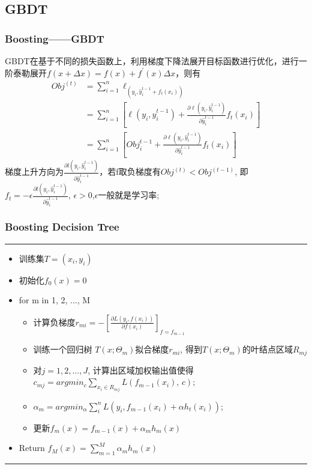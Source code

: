 \documentclass[usenames,dvipsnames]{beamer}
\begin{document}
\subsection{GBDT}
\begin{frame}
\frametitle{Boosting——GBDT}
GBDT在基于不同的损失函数上，利用梯度下降法展开目标函数进行优化，进行一阶泰勒展开$f(x+\Delta x) = f(x) + f^{'}(x)\Delta x$，则有
\begin{align*}
  Obj^{(t)} & = \sum_{i=1}^{n}\ell_(y_i, \hat{y}_{i}^{t-1}+f_t(x_i)) \\
        & = \sum_{i=1}^{n}[\ell(y_i, \hat{y}_{i}^{t-1})+\frac{\partial \ell(y_i, \hat{y}_{i}^{t-1})}{\partial \hat{y}_{i}^{t-1}}f_t(x_i)]\\
        & = \sum_{i=1}^{n}[Obj_i^{t-1}+\frac{\partial \ell(y_i, \hat{y}_{i}^{t-1})}{\partial \hat{y}_{i}^{t-1}}f_t(x_i)]
\end{align*}
梯度上升方向为$\frac{\partial l(y_i, \hat{y}_{i}^{t-1})}{\partial \hat{y}_{i}^{t-1}}$，若f取负梯度有$Obj^{(t)} < Obj^{(t-1)}$, 即$f_t = -\epsilon \frac{\partial l(y_i, \hat{y}_{i}^{t-1})}{\partial \hat{y}_{i}^{t-1}},\, \epsilon>0$,$\epsilon$一般就是学习率;\\
\end{frame}
\begin{frame}
\frametitle{Boosting Decision Tree}
\noindent\rule[0.10\baselineskip]{\textwidth}{0.75pt}
  \begin{itemize}
    \item 训练集$T={(x_i,y_i)}$
    \item 初始化$f_0(x) = 0$
    \item for m in 1, 2, ..., M
      \begin{itemize}
        \item 计算负梯度$r_{mi} = -[\frac{\partial L(y_i, f(x_i))}{\partial f(x_i)}]_{f=f_{m-1}}$
        \item 训练一个回归树 $T(x;\Theta_m)$拟合梯度$r_{mi}$, 得到$T(x;\Theta_m)$的叶结点区域$R_{mj}$
        \item 对$j = 1, 2,\dots, J$, 计算出区域加权输出值使得$c_{mj} = argmin_{c}\sum_{x_i\in R_{mj}}L(f_{m-1}(x_i),\,c)$;
        \item $\alpha_m = argmin_{\alpha}\sum_{i}^{n}L(y_i, f_{m-1}(x_i)+\alpha h_t(x_i))$;
        \item 更新$f_m(x)  = f_{m-1}(x) + \alpha_mh_m(x)$
      \end{itemize}
    \item Return  $f_M(x) = \sum_{m=1}^{M}\alpha_mh_m(x)$
  \end{itemize}
\noindent\rule[0.10\baselineskip]{\textwidth}{0.75pt}\par
\end{frame}
\end{document}
